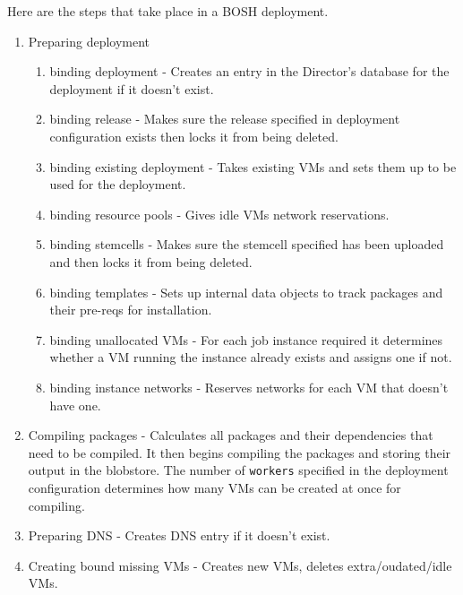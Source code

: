 Here are the steps that take place in a BOSH deployment.

\begin{enumerate}
\item Preparing deployment

\begin{enumerate}
\item binding deployment - Creates an entry in the Director's database for the deployment if it doesn't exist.

\item binding release - Makes sure the release specified in deployment configuration exists then locks it from being deleted.

\item binding existing deployment - Takes existing VMs and sets them up to be used for the deployment.

\item binding resource pools - Gives idle VMs network reservations.

\item binding stemcells - Makes sure the stemcell specified has been uploaded and then locks it from being deleted.

\item binding templates - Sets up internal data objects to track packages and their pre-reqs for installation.

\item binding unallocated VMs - For each job instance required it determines whether a VM running the instance already exists and assigns one if not.

\item binding instance networks - Reserves networks for each VM that doesn't have one.

\end{enumerate}

\item Compiling packages - Calculates all packages and their dependencies that need to be compiled. It then begins compiling the packages and storing their output in the blobstore. The number of \texttt{workers} specified in the deployment configuration determines how many VMs can be created at once for compiling.

\item Preparing DNS - Creates DNS entry if it doesn't exist.

\item Creating bound missing VMs - Creates new VMs, deletes extra\slash oudated\slash idle VMs.


\end{enumerate}
